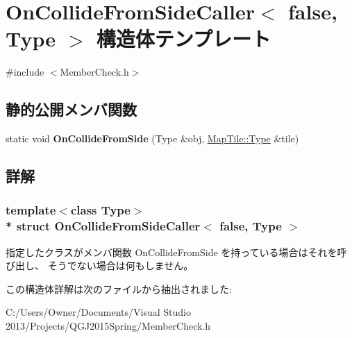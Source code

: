 \hypertarget{struct_on_collide_from_side_caller_3_01false_00_01_type_01_4}{}\section{On\+Collide\+From\+Side\+Caller$<$ false, Type $>$ 構造体テンプレート}
\label{struct_on_collide_from_side_caller_3_01false_00_01_type_01_4}


 




{\ttfamily \#include $<$Member\+Check.\+h$>$}

\subsection*{静的公開メンバ関数}
\begin{DoxyCompactItemize}
\item 
static void {\bfseries On\+Collide\+From\+Side} (Type \&obj, \hyperlink{struct_my_map_tile}{Map\+Tile\+::\+Type} \&tile)\hypertarget{struct_on_collide_from_side_caller_3_01false_00_01_type_01_4_a7934c1238a1f95ce9b6b120b7d03a59a}{}\label{struct_on_collide_from_side_caller_3_01false_00_01_type_01_4_a7934c1238a1f95ce9b6b120b7d03a59a}

\end{DoxyCompactItemize}


\subsection{詳解}
\subsubsection*{template$<$class Type$>$\\*
struct On\+Collide\+From\+Side\+Caller$<$ false, Type $>$}



指定したクラスがメンバ関数 On\+Collide\+From\+Side を持っている場合はそれを呼び出し、 そうでない場合は何もしません。 

この構造体詳解は次のファイルから抽出されました\+:\begin{DoxyCompactItemize}
\item 
C\+:/\+Users/\+Owner/\+Documents/\+Visual Studio 2013/\+Projects/\+Q\+G\+J2015\+Spring/Member\+Check.\+h\end{DoxyCompactItemize}
